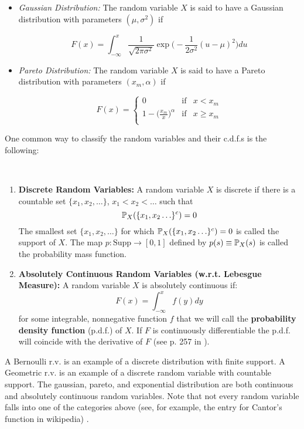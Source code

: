 \documentclass[11pt]{article} %
\begin{document}
\begin{itemize}
\item \emph{Gaussian Distribution:} The random variable $X$ is said to have a Gaussian distribution with parameters $(\mu, \sigma^2)$ if 

$$F(x) = \int_{-\infty}^{x} \frac{1}{\sqrt{2 \pi \sigma^2} } \exp\Big(-\frac{1}{2 \sigma^2} (u-\mu)^2 \Big) du $$ 

\item \emph{Pareto Distribution:} The random variable $X$ is said to have a Pareto distribution with parameters $(x_m, \alpha)$ if 

\begin{equation*}
F(x) = 
\left\{
\begin{array}{ccc}
0  & \text{if}  & x < x_m   \\
1-\Big(\frac{x_m}{x} \Big)^{\alpha} & \text{if}  & x \geq x_m   \\
\end{array}
\right.
\end{equation*}

\end{itemize}

One common way to classify the random variables and their c.d.f.s is the following:

\begin{definition}  \:\
\begin{enumerate}
\item \textbf{Discrete Random Variables:} A random variable $X$ is discrete if there is a countable set $\{x_1, x_2, \ldots\}$, $x_1<x_2<\ldots$ such that 
$$\mathbb{P}_{X}(\{x_1, x_2\ldots \}^c)=0$$
The smallest set $\{x_1, x_2, \ldots\}$ for which $\mathbb{P}_{X}(\{x_1, x_2\ldots \}^c)=0$ is called the support of $X$. The map $p: \text{Supp} \rightarrow [0,1]$ defined by $p(s)\equiv\mathbb{P}_{X}(s)$ is called the probability mass function. 
\item \textbf{Absolutely Continuous Random Variables (w.r.t. Lebesgue Measure):} A random variable $X$ is absolutely continuous if:
$$F(x) = \int_{-\infty}^{x} f(y)dy $$
for some integrable, nonnegative function $f$ that we will call the \textbf{probability density function} (p.d.f.) of $X$. If $F$ is continuously differentiable the p.d.f. will coincide with the derivative of $F$ (see p. 257 in \cite{Billingsley95}).
\end{enumerate}

\end{definition}

A Bernoulli r.v. is an example of a discrete distribution with finite support. A Geometric r.v. is an example of a discrete random variable with countable support. The gaussian, pareto, and exponential distribution are both continuous and absolutely continuous random variables. Note that not every random variable falls into one of the categories above (see, for example, the entry for Cantor's function in wikipedia) .
\end{document}
